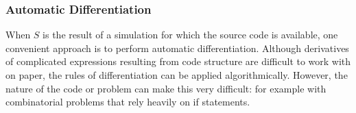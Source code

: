 



%



\subsubsection{Automatic Differentiation}

When $S$ is the result of a simulation for which the source code is available, one convenient approach is to perform automatic differentiation.
Although derivatives of complicated expressions resulting from code structure are difficult to work with on paper, the rules of differentiation can be applied algorithmically.
However, the nature of the code or problem can make this very difficult: for example with combinatorial problems that rely heavily on if statements.

